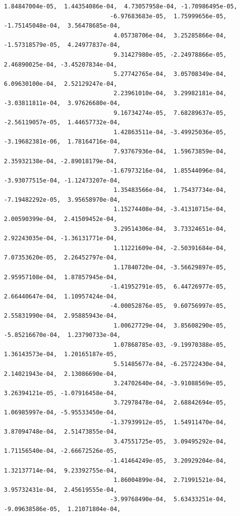 \documentclass[11pt]{article}
\begin{document}
\begin{Verbatim}[commandchars=\\\{\}]
                               1.84847004e-05,  1.44354086e-04,  4.73057958e-04, -1.70986495e-05,
                              -6.97683683e-05,  1.75999656e-05, -1.75145048e-04,  3.56478685e-04,
                               4.05738706e-04,  3.25285866e-04, -1.57318579e-05,  4.24977837e-04,
                               9.31427980e-05, -2.24978866e-05,  2.46890025e-04, -3.45207834e-04,
                               5.27742765e-04,  3.05708349e-04,  6.09630100e-04,  2.52129247e-04,
                               2.23961010e-04,  3.29982181e-04, -3.03811811e-04,  3.97626680e-04,
                               9.16734274e-05,  7.68289637e-05, -2.56119057e-05,  1.44657732e-04,
                               1.42863511e-04, -3.49925036e-05, -3.19682381e-06,  1.78164716e-04,
                               7.93767936e-04,  1.59673859e-04,  2.35932138e-04, -2.89018179e-04,
                              -1.67973216e-04,  1.85544096e-04, -3.93077515e-04, -1.12473207e-04,
                               1.35483566e-04,  1.75437734e-04, -7.19482292e-05,  3.95658970e-04,
                               1.15274408e-04, -3.41310715e-04,  2.00590399e-04,  2.41509452e-04,
                               3.29514306e-04,  3.73324651e-04,  2.92243035e-04, -1.36131771e-04,
                               1.11221609e-04, -2.50391684e-04,  7.07353620e-05,  2.26452797e-04,
                               1.17840720e-04, -3.56629897e-05,  2.95957108e-04,  1.87857945e-04,
                              -1.41952791e-05,  6.44726977e-05,  2.66440647e-04,  1.10957424e-04,
                              -4.00052876e-05,  9.60756997e-05,  2.55831990e-04,  2.95885943e-04,
                               1.00627729e-04,  3.85608290e-05, -5.85216670e-04,  1.23790733e-04,
                               1.07868785e-03, -9.19970388e-05,  1.36143573e-04,  1.20165187e-05,
                               5.51485677e-04, -6.25722430e-04,  2.14021943e-04,  2.13086690e-04,
                               3.24702640e-04, -3.91088569e-05,  3.26394121e-05, -1.07916458e-04,
                               3.72978478e-04,  2.68842694e-05,  1.06985997e-04, -5.95533450e-04,
                              -1.37939912e-05,  1.54911470e-04,  3.87094748e-04,  2.51473855e-04,
                               3.47551725e-05,  3.09495292e-04,  1.71156540e-04, -2.66672526e-05,
                              -1.41464249e-05,  3.20929204e-04,  1.32137714e-04,  9.23392755e-04,
                               1.86004899e-04,  2.71991521e-04,  3.95732431e-04,  2.45619555e-04,
                              -3.99768490e-04,  5.63433251e-04, -9.09638586e-05,  1.21071804e-04,

\end{Verbatim}
\end{document}
